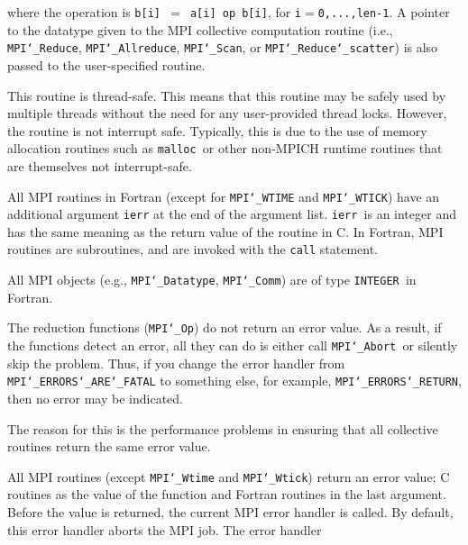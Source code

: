 where the operation is {\tt b[i] $=$ a[i] op b[i]}, for {\tt i$=$0,...,len-1}.  A pointer
to the datatype given to the MPI collective computation routine (i.e.,
{\tt MPI{\tt \char`\_}Reduce}, {\tt MPI{\tt \char`\_}Allreduce}, {\tt MPI{\tt \char`\_}Scan}, or {\tt MPI{\tt \char`\_}Reduce{\tt \char`\_}scatter}) is also
passed to the user-specified routine.
\par
{}
\par
This routine is thread-safe.  This means that this routine may be
safely used by multiple threads without the need for any user-provided
thread locks.  However, the routine is not interrupt safe.  Typically,
this is due to the use of memory allocation routines such as {\tt malloc
}or other non-MPICH runtime routines that are themselves not interrupt-safe.
\par
{}
All MPI routines in Fortran (except for {\tt MPI{\tt \char`\_}WTIME} and {\tt MPI{\tt \char`\_}WTICK}) have
an additional argument {\tt ierr} at the end of the argument list.  {\tt ierr
}is an integer and has the same meaning as the return value of the routine
in C.  In Fortran, MPI routines are subroutines, and are invoked with the
{\tt call} statement.
\par
All MPI objects (e.g., {\tt MPI{\tt \char`\_}Datatype}, {\tt MPI{\tt \char`\_}Comm}) are of type {\tt INTEGER
}in Fortran.
\par
{}
\par
The reduction functions ({\tt MPI{\tt \char`\_}Op}) do not return an error value.  As a result,
if the functions detect an error, all they can do is either call {\tt MPI{\tt \char`\_}Abort
}or silently skip the problem.  Thus, if you change the error handler from
{\tt MPI{\tt \char`\_}ERRORS{\tt \char`\_}ARE{\tt \char`\_}FATAL} to something else, for example, {\tt MPI{\tt \char`\_}ERRORS{\tt \char`\_}RETURN},
then no error may be indicated.
\par
The reason for this is the performance problems in ensuring that
all collective routines return the same error value.
\par
{}
\par
All MPI routines (except {\tt MPI{\tt \char`\_}Wtime} and {\tt MPI{\tt \char`\_}Wtick}) return an error value;
C routines as the value of the function and Fortran routines in the last
argument.  Before the value is returned, the current MPI error handler is
called.  By default, this error handler aborts the MPI job.  The error handler
